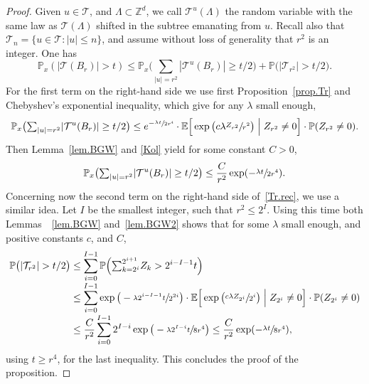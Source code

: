 \documentclass[JEP,XML,SOM,Unicode,NoFloatCountersInSection,published]{cedram}
\let\ts\textstyle
\theoremstyle{plain}
\theoremstyle{definition}
\newcommand\Z{\mathbb{Z}}
\newcommand{\1}{{\text{\Large $\mathfrak 1$}}}
\begin{document}
\begin{proof}
Given $u\in \mathcal T$, and $\Lambda\subset \Z^d$, we
call $\mathcal T^u(\Lambda)$ the random variable with the same law
as $\mathcal T(\Lambda)$ shifted in the subtree emanating from $u$.
Recall also that \hbox{$\mathcal T_n=\{u\in \mathcal T: |u|\le n\}$}, and assume without loss of generality that $r^2$ is an integer.
One has\vspace*{-3pt}
\begin{equation}\label{Tr.rec}
\mathbb P_x(|\mathcal T(B_r)|>t) \le \mathbb P_x\big({\ts\sum_{|u|=r^2}} |\mathcal T^u(B_r)|\ge t/2\big)+
\mathbb P\big(|\mathcal T_{r^2}|>t/2\big).
\end{equation}
For the first term on the right-hand side we use first Proposition~\ref{prop.Tr} and Chebyshev's exponential inequality,
which give for any $\lambda$ small enough,\vspace*{-3pt}
\[
\mathbb P_x\big({\ts\sum_{|u|=r^2}} |\mathcal T^u(B_r)|\ge t/2\big) \le e^{- \sfrac{\lambda t}{2r^4}} \cdot \mathbb E\Big[\exp\big(c\lambda \sfrac{Z_{r^2}}{r^2}\big)\Bigm|Z_{r^2}\neq 0\Big]\cdot \mathbb P(Z_{r^2}\neq 0).
\]
Then Lemma~\ref{lem.BGW} and \eqref{Kol} yield for some constant $C>0$,\vspace*{-3pt}
\[
\mathbb P_x\big({\ts\sum_{|u|=r^2}} |\mathcal T^u(B_r)|\ge t/2\big)
\le \frac{C}{r^2} \exp(-\sfrac{\lambda t}{2r^4}).
\]
Concerning now the second term on the right-hand side of~\eqref{Tr.rec}, we use a similar idea.
Let $I$ be the smallest integer, such that $r^2\le 2^I$. Using this time both Lemmas~~\ref{lem.BGW} and~\ref{lem.BGW2} shows that
for some $\lambda$ small enough, and positive constants $c$, and $C$,\vspace*{-3pt}
\begin{align*}
\mathbb P\big(|\mathcal T_{r^2}|>t/2\big) & \le \sum_{i=0}^{I-1} \mathbb P\Big({\ts\sum_{k=2^i}^{2^{i+1}}} Z_k >2^{i-I-1} t\Big)\\[-3pt]
& \le \sum_{i=0}^{I-1} \exp\big(-\sfrac{\lambda 2^{i-I-1}t}{2^{2i}}\big)\cdot \mathbb E\Big[\exp\big(\sfrac{c\lambda Z_{2^i}}{2^i}\big)\Bigm|  Z_{2^i}\neq 0\Big]\cdot \mathbb P(Z_{2^i}\neq 0) \\[-3pt]
& \le \frac{C}{r^2} \sum_{i=0}^{I-1}2^{I-i} \exp\big(-\sfrac{\lambda 2^{I-i}t}{8r^4}\big) \le \frac{C}{r^2} \exp(-\sfrac{\lambda t}{8r^4}),
\end{align*}
using $t\ge r^4$, for the last inequality. This concludes the proof of the proposition.
\end{proof}
\end{document}
